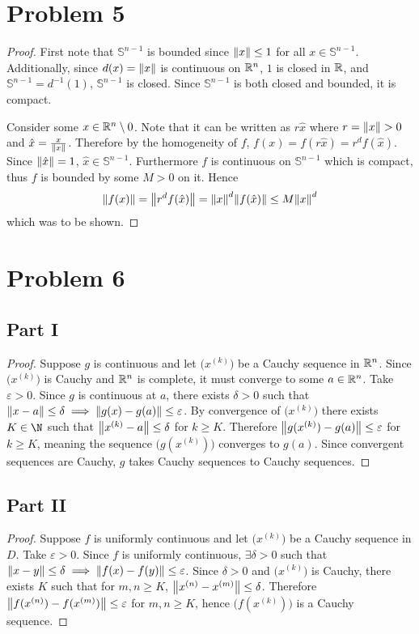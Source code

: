 \documentclass{eeleyes}
\newcommand\eps{\varepsilon}
\begin{document}
\section*{Problem 5}
\begin{proof}
    First note that $\mathbb{S}^{n-1}$ is bounded since $\norm{x} \leq 1$ for all $x \in \mathbb{S}^{n-1}$. Additionally, since $d(x) = \norm{x}$ is continuous on $\mathbb{R}^n$, $\qty{1}$ is closed in $\mathbb{R}$, and $\mathbb{S}^{n-1} = d^{-1}(\qty{1})$, $\mathbb{S}^{n-1}$ is closed. Since $\mathbb{S}^{n-1}$ is both closed and bounded, it is compact.

    Consider some $x \in \mathbb{R}^n \setminus{0}$. Note that it can be written as $r \hat{x}$ where $r = \norm{x} > 0$ and $\hat{x} = \frac{x}{\norm{x}}$. Therefore by the homogeneity of $f$, $f(x) = f(r\hat{x}) = r^d f(\hat{x})$. Since $\norm{\hat{x}} = 1$, $\hat{x} \in \mathbb{S}^{n-1}$. Furthermore $f$ is continuous on $\mathbb{S}^{n-1}$ which is compact, thus $f$ is bounded by some $M > 0$ on it. Hence
    \[
        \norm{f(x)} = \norm{r^d f(\hat{x})} = \norm{x}^{d} \norm{f(\hat{x})} \leq M \norm{x}^{d}
    \]
    which was to be shown.
\end{proof}

\section*{Problem 6}
\subsection*{Part I}
\begin{proof}
    Suppose $g$ is continuous and let $\bigl(x^{(k)}\bigr)$ be a Cauchy sequence in $\mathbb{R}^n$. Since $\bigl(x^{(k)}\bigr)$ is Cauchy and $\mathbb{R}^n$ is complete, it must converge to some $a \in \mathbb{R}^n$. Take $\eps > 0$. Since $g$ is continuous at $a$, there exists $\delta > 0$ such that $\norm{x - a} \leq \delta \implies \norm{g(x) - g(a)} \leq \eps$. By convergence of $\bigl(x^{(k)}\bigr)$ there exists $K \in \N$ such that $\norm{x^{(k)} - a} \leq \delta$ for $k \geq K$. Therefore $\norm{g(x^{(k)}) - g(a)} \leq \eps$ for $k \geq K$, meaning the sequence $\bigl(g(x^{(k)})\bigr)$ converges to $g(a)$. Since convergent sequences are Cauchy, $g$ takes Cauchy sequences to Cauchy sequences.
\end{proof}

\subsection*{Part II}
\begin{proof}
    Suppose $f$ is uniformly continuous and let $\bigl(x^{(k)}\bigr)$ be a Cauchy sequence in $D$. Take $\eps > 0$. Since $f$ is uniformly continuous, $\exists \delta > 0$ such that $\norm{x - y} \leq \delta \implies \norm{f(x) - f(y)} \leq \eps$. Since $\delta > 0$ and $\bigl(x^{(k)}\bigr)$ is Cauchy, there exists $K$ such that for $m,n \geq K$, $\norm{x^{(n)} - x^{(m)}} \leq \delta$. Therefore $\norm{f(x^{(n)}) - f(x^{(m)})} \leq \eps$ for $m,n \geq K$, hence $\bigl(f(x^{(k)})\bigr)$ is a Cauchy sequence.
\end{proof}
\end{document}
